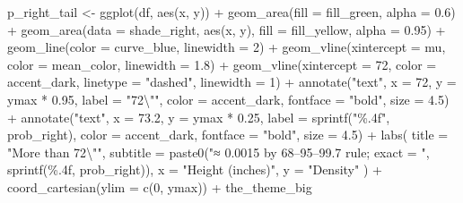 \documentclass[
  letterpaper,
  DIV=11,
  numbers=noendperiod]{scrreprt}
\newenvironment{Shaded}{\begin{snugshade}}{\end{snugshade}}
\newcommand{\AttributeTok}[1]{\textcolor[rgb]{0.40,0.45,0.13}{#1}}
\newcommand{\DecValTok}[1]{\textcolor[rgb]{0.68,0.00,0.00}{#1}}
\newcommand{\FloatTok}[1]{\textcolor[rgb]{0.68,0.00,0.00}{#1}}
\newcommand{\FunctionTok}[1]{\textcolor[rgb]{0.28,0.35,0.67}{#1}}
\newcommand{\NormalTok}[1]{\textcolor[rgb]{0.00,0.23,0.31}{#1}}
\newcommand{\OtherTok}[1]{\textcolor[rgb]{0.00,0.23,0.31}{#1}}
\newcommand{\SpecialCharTok}[1]{\textcolor[rgb]{0.37,0.37,0.37}{#1}}
\newcommand{\StringTok}[1]{\textcolor[rgb]{0.13,0.47,0.30}{#1}}
\begin{document}
\begin{Shaded}
\begin{Highlighting}[]
\NormalTok{p\_right\_tail }\OtherTok{\textless{}{-}} \FunctionTok{ggplot}\NormalTok{(df, }\FunctionTok{aes}\NormalTok{(x, y)) }\SpecialCharTok{+}
  \FunctionTok{geom\_area}\NormalTok{(}\AttributeTok{fill =}\NormalTok{ fill\_green, }\AttributeTok{alpha =} \FloatTok{0.6}\NormalTok{) }\SpecialCharTok{+}
  \FunctionTok{geom\_area}\NormalTok{(}\AttributeTok{data =}\NormalTok{ shade\_right, }\FunctionTok{aes}\NormalTok{(x, y), }\AttributeTok{fill =}\NormalTok{ fill\_yellow, }\AttributeTok{alpha =} \FloatTok{0.95}\NormalTok{) }\SpecialCharTok{+}
  \FunctionTok{geom\_line}\NormalTok{(}\AttributeTok{color =}\NormalTok{ curve\_blue, }\AttributeTok{linewidth =} \DecValTok{2}\NormalTok{) }\SpecialCharTok{+}
  \FunctionTok{geom\_vline}\NormalTok{(}\AttributeTok{xintercept =}\NormalTok{ mu, }\AttributeTok{color =}\NormalTok{ mean\_color, }\AttributeTok{linewidth =} \FloatTok{1.8}\NormalTok{) }\SpecialCharTok{+}
  \FunctionTok{geom\_vline}\NormalTok{(}\AttributeTok{xintercept =} \DecValTok{72}\NormalTok{, }\AttributeTok{color =}\NormalTok{ accent\_dark, }
             \AttributeTok{linetype =} \StringTok{"dashed"}\NormalTok{, }\AttributeTok{linewidth =} \DecValTok{1}\NormalTok{) }\SpecialCharTok{+}
  \FunctionTok{annotate}\NormalTok{(}\StringTok{"text"}\NormalTok{, }\AttributeTok{x =} \DecValTok{72}\NormalTok{, }\AttributeTok{y =}\NormalTok{ ymax }\SpecialCharTok{*} \FloatTok{0.95}\NormalTok{, }\AttributeTok{label =} \StringTok{"72}\SpecialCharTok{\textbackslash{}"}\StringTok{"}\NormalTok{, }
           \AttributeTok{color =}\NormalTok{ accent\_dark, }\AttributeTok{fontface =} \StringTok{"bold"}\NormalTok{, }\AttributeTok{size =} \FloatTok{4.5}\NormalTok{) }\SpecialCharTok{+}
  \FunctionTok{annotate}\NormalTok{(}\StringTok{"text"}\NormalTok{, }\AttributeTok{x =} \FloatTok{73.2}\NormalTok{, }\AttributeTok{y =}\NormalTok{ ymax }\SpecialCharTok{*} \FloatTok{0.25}\NormalTok{, }
           \AttributeTok{label =} \FunctionTok{sprintf}\NormalTok{(}\StringTok{"\%.4f"}\NormalTok{, prob\_right), }
           \AttributeTok{color =}\NormalTok{ accent\_dark, }\AttributeTok{fontface =} \StringTok{"bold"}\NormalTok{, }\AttributeTok{size =} \FloatTok{4.5}\NormalTok{) }\SpecialCharTok{+}
  \FunctionTok{labs}\NormalTok{(}
    \AttributeTok{title =} \StringTok{"More than 72}\SpecialCharTok{\textbackslash{}"}\StringTok{"}\NormalTok{,}
    \AttributeTok{subtitle =} \FunctionTok{paste0}\NormalTok{(}\StringTok{"≈ 0.0015 by 68–95–99.7 rule; exact = "}\NormalTok{, }\FunctionTok{sprintf}\NormalTok{(}\StringTok{\textquotesingle{}\%.4f\textquotesingle{}}\NormalTok{, prob\_right)),}
    \AttributeTok{x =} \StringTok{"Height (inches)"}\NormalTok{, }\AttributeTok{y =} \StringTok{"Density"}
\NormalTok{  ) }\SpecialCharTok{+}
  \FunctionTok{coord\_cartesian}\NormalTok{(}\AttributeTok{ylim =} \FunctionTok{c}\NormalTok{(}\DecValTok{0}\NormalTok{, ymax)) }\SpecialCharTok{+}
\NormalTok{  the\_theme\_big}


\end{Highlighting}
\end{Shaded}
\end{document}
